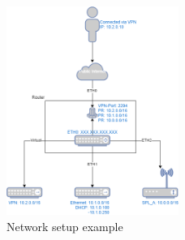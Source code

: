 \begin{figure}[ht!]
    \centering
    \includegraphics[width=0.5\textwidth]{figs/network.png}
    \caption{Network setup example}
\end{figure}

